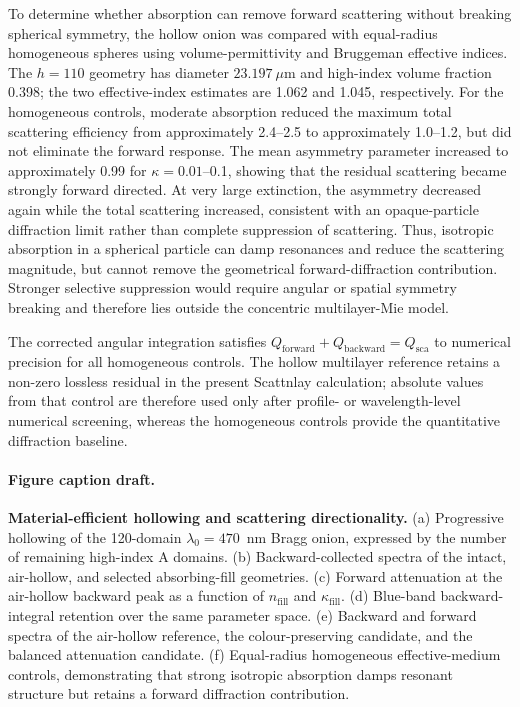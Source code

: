 To determine whether absorption can remove forward scattering without breaking
spherical symmetry, the hollow onion was compared with equal-radius homogeneous
spheres using volume-permittivity and Bruggeman effective indices. The $h=110$
geometry has diameter $23.197~\mu$m and high-index volume fraction 0.398; the two
effective-index estimates are 1.062 and 1.045, respectively. For the homogeneous
controls, moderate absorption reduced the maximum total scattering efficiency from
approximately 2.4--2.5 to approximately 1.0--1.2, but did not eliminate the forward
response. The mean asymmetry parameter increased to approximately 0.99 for
$\kappa=0.01$--0.1, showing that the residual scattering became strongly forward
directed. At very large extinction, the asymmetry decreased again while the total
scattering increased, consistent with an opaque-particle diffraction limit rather
than complete suppression of scattering. Thus, isotropic absorption in a spherical
particle can damp resonances and reduce the scattering magnitude, but cannot remove
the geometrical forward-diffraction contribution. Stronger selective suppression
would require angular or spatial symmetry breaking and therefore lies outside the
concentric multilayer-Mie model.

The corrected angular integration satisfies
$Q_{\mathrm{forward}}+Q_{\mathrm{backward}}=Q_{\mathrm{sca}}$ to numerical
precision for all homogeneous controls. The hollow multilayer reference retains a
non-zero lossless residual in the present Scattnlay calculation; absolute values from
that control are therefore used only after profile- or wavelength-level numerical
screening, whereas the homogeneous controls provide the quantitative diffraction
baseline.

\paragraph{Figure caption draft.}
\textbf{Material-efficient hollowing and scattering directionality.}
(a) Progressive hollowing of the 120-domain $\lambda_0=470$~nm Bragg onion,
expressed by the number of remaining high-index A domains. (b) Backward-collected
spectra of the intact, air-hollow, and selected absorbing-fill geometries.
(c) Forward attenuation at the air-hollow backward peak as a function of
$n_{\mathrm{fill}}$ and $\kappa_{\mathrm{fill}}$. (d) Blue-band backward-integral
retention over the same parameter space. (e) Backward and forward spectra of the
air-hollow reference, the colour-preserving candidate, and the balanced attenuation
candidate. (f) Equal-radius homogeneous effective-medium controls, demonstrating
that strong isotropic absorption damps resonant structure but retains a forward
diffraction contribution.
